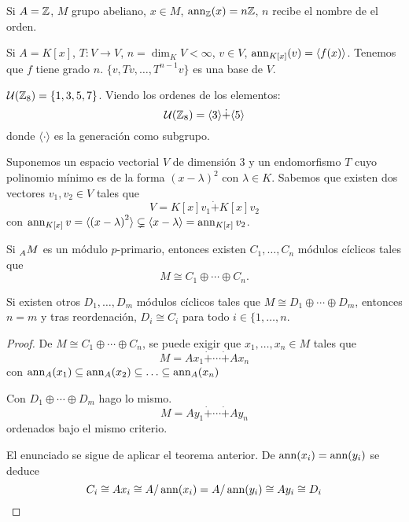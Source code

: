 \begin{obs}
  Si \(A=\mathbb{Z}\), \(M\) grupo abeliano, \(x\in M\),
  \(\operatorname{ann}_{\mathbb{Z}}(x)=n\mathbb{Z}\), \(n\) recibe el nombre de el orden.
\end{obs}

\begin{obs}
  Si \(A=K[x]\), \(T:V\longrightarrow V\), \(n=\dim_K V<\infty\),
  \(v\in V\), \(\operatorname{ann}_{K[x]}(v)=\langle f(x)\rangle\).
  Tenemos que \(f\) tiene grado \(n\). \(\{v, Tv,\ldots, T^{n-1}v\}\)
  es una base de \(V\).
\end{obs}

\begin{ejemplo}
  \(\mathcal{U}(\mathbb{Z}_8)=\{1,3,5,7\}\).
  Viendo los ordenes de los elementos:
  \[\mathcal{U}(\mathbb{Z}_8)=\langle 3\rangle\dot{+}\langle 5\rangle\]
  donde \(\langle \cdot\rangle\) es la generación como subgrupo.
\end{ejemplo}

\begin{ejemplo}
  Suponemos un espacio vectorial \(V\) de dimensión 3 y un
  endomorfismo \(T\) cuyo polinomio mínimo es de la forma
  \({(x-\lambda)}^2\) con \(\lambda\in K\).
  Sabemos que existen dos vectores \(v_1,v_2 \in V\) tales que
  \[
    V=K[x]v_1\dot{+} K[x]v_2
  \]
  con \(\operatorname{ann}_{K[x]} v = \langle {(x-\lambda)}^2\rangle
  \subsetneq\langle {x-\lambda}\rangle = \operatorname{ann}_{K[x]} v_2\).
\end{ejemplo}

\begin{cor}
  Si \(\prescript{}{A}{M}\) es un módulo \(p\)-primario, entonces existen
  \(C_1, \ldots, C_n\) módulos cíclicos tales que
  \[
    M\cong C_1\oplus\cdots\oplus C_n.
  \]

  Si existen otros \(D_1, \ldots, D_m\) módulos cíclicos tales que \(M\cong D_1\oplus
  \cdots\oplus D_m\), entonces
  \(n=m\) y tras reordenación, \(D_i\cong C_i\) para todo \(i \in \{1, \ldots, n\).
\end{cor}
\begin{proof}
  De \(M\cong C_1\oplus\cdots\oplus C_n\), se puede exigir que
  \(x_1,\ldots,x_n\in M\) tales que
  \[
    M=Ax_1\dot{+}\cdots\dot{+}Ax_n
  \]
  con \(\operatorname{ann}_A(x_1)\subseteq\operatorname{ann}_A(x_2)\subseteq\ldots\subseteq\operatorname{ann}_A(x_n)\)

  Con \(D_1\oplus\cdots\oplus D_m\) hago lo mismo.
  \[
    M=Ay_1\dot{+}\cdots\dot{+}Ay_n
  \]
  ordenados bajo el mismo criterio.

  El enunciado se sigue de aplicar el teorema anterior. De
  \(\operatorname{ann}(x_i)=\operatorname{ann}(y_i)\) se deduce
  \[
    C_i\cong Ax_i\cong A/\operatorname{ann}(x_i)=A/\operatorname{ann}(y_i)\cong Ay_i\cong D_i
  \]
\end{proof}

